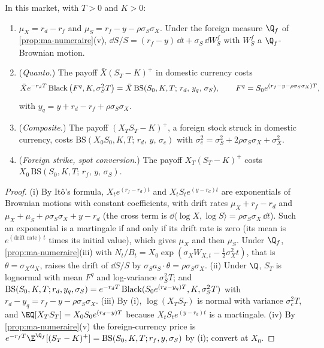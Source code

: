 \begin{proposition}\label{prop:ma-quanto}
In this market, with $T>0$ and $K>0$:
\begin{enumerate}[label=(\roman*)]
  \item $\mu_X=r_d-r_f$ and $\mu_S=r_f-y-\rho\sigma_S\sigma_X$. Under the foreign measure $\Q_f$ of
    \cref{prop:ma-numeraire}(v), $\dd S/S=(r_f-y)\,\dd t+\sigma_S\,\dd W^f_S$ with $W^f_S$ a
    $\Q_f$-Brownian motion.
  \item (\emph{Quanto.}) The payoff $\bar X(S_T-K)^+$ in domestic currency costs
    \[
      \bar Xe^{-r_dT}\operatorname{Black}\big(F^q,K,\sigma_S^2T\big)=\bar X\,\mathrm{BS}(S_0,K,T;\,r_d,\,y_q,\,\sigma_S),\qquad
      F^q=S_0e^{(r_f-y-\rho\sigma_S\sigma_X)T},
    \]
    with $y_q=y+r_d-r_f+\rho\sigma_S\sigma_X$.
  \item (\emph{Composite.}) The payoff $(X_TS_T-K)^+$, a foreign stock struck in domestic currency,
    costs $\mathrm{BS}(X_0S_0,K,T;\,r_d,\,y,\,\sigma_c)$ with
    $\sigma_c^2=\sigma_S^2+2\rho\sigma_S\sigma_X+\sigma_X^2$.
  \item (\emph{Foreign strike, spot conversion.}) The payoff $X_T(S_T-K)^+$ costs
    $X_0\,\mathrm{BS}(S_0,K,T;\,r_f,\,y,\,\sigma_S)$.
\end{enumerate}
\end{proposition}

\begin{proof}
(i) By It\^o's formula, $X_te^{(r_f-r_d)t}$ and $X_tS_te^{(y-r_d)t}$ are exponentials of
Brownian motions with constant coefficients, with drift rates $\mu_X+r_f-r_d$ and
$\mu_X+\mu_S+\rho\sigma_S\sigma_X+y-r_d$ (the cross term is $\dd\langle\log X,\log S\rangle=\rho\sigma_S\sigma_X\,\dd t$).
Such an exponential is a martingale if and only if its drift rate is zero (its mean is
$e^{(\text{drift rate})\,t}$ times its initial value), which gives $\mu_X$ and then $\mu_S$. Under $\Q_f$,
\cref{prop:ma-numeraire}(iii) with $N_t/B_t=X_0\exp(\sigma_XW_{X,t}-\frac12\sigma_X^2t)$, that is
$\theta=\sigma_Xa_X$, raises the drift of $\dd S/S$ by $\sigma_Sa_S\cdot\theta=\rho\sigma_S\sigma_X$.
(ii) Under $\Q$, $S_T$ is lognormal with mean $F^q$ and log-variance $\sigma_S^2T$; and
$\mathrm{BS}(S_0,K,T;r_d,y_q,\sigma_S)=e^{-r_dT}\operatorname{Black}(S_0e^{(r_d-y_q)T},K,\sigma_S^2T)$ with $r_d-y_q=r_f-y-\rho\sigma_S\sigma_X$.
(iii) By (i), $\log(X_TS_T)$ is normal with variance $\sigma_c^2T$, and $\EQ[X_TS_T]=X_0S_0e^{(r_d-y)T}$
because $X_tS_te^{(y-r_d)t}$ is a martingale. (iv) By \cref{prop:ma-numeraire}(v) the foreign-currency
price is $e^{-r_fT}\E^{\Q_f}[(S_T-K)^+]=\mathrm{BS}(S_0,K,T;r_f,y,\sigma_S)$ by (i); convert at $X_0$.
\end{proof}

